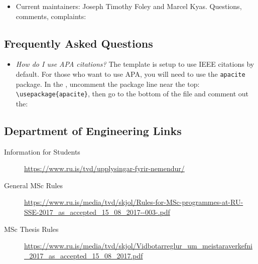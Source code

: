 \begin{itemize}
\item Current maintainers: Joseph Timothy Foley and Marcel Kyas.
  Questions, comments, complaints:  

\end{itemize}

\subsection{Frequently Asked Questions}
\begin{itemize}
\item {\em How do I use APA citations?}
  The template is setup to use IEEE citations by default.
  For those who want to use APA, you will need to use the \texttt{apacite} package.
  In the , uncomment the package line near the top: \verb|\usepackage{apacite}|, then go to the bottom of the file and comment out the: \verb||
\end{itemize}

\subsection{Department of Engineering Links}
\begin{description}
\item[Information for Students] \url{https://www.ru.is/tvd/upplysingar-fyrir-nemendur/}
\item[General MSc Rules] \url{https://www.ru.is/media/tvd/skjol/Rules-for-MSc-programmes-at-RU-SSE-2017_as_accepted_15_08_2017--003-.pdf}
\item[MSc Thesis Rules] \url{https://www.ru.is/media/tvd/skjol/Vidbotarreglur_um_meistaraverkefni_2017_as_accepted_15_08_2017.pdf}
\end{description}

